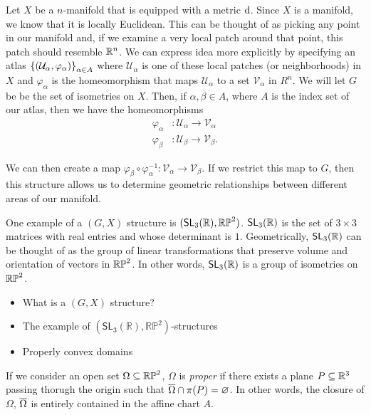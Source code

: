 \documentclass{amsart}
\begin{document}
	Let $X$ be a $n$-manifold that is equipped with a metric $\operatorname{d}$. Since $X$ is a manifold, we know that it is locally Euclidean. This can be thought of as picking any point in our manifold and, if we examine a very local patch around that point, this patch should resemble $\mathbb{R}^n$. We can express idea more explicitly by specifying an atlas $\left\{(\mathcal{U}_\alpha, \varphi_\alpha)\right\}_{\alpha \in A}$ where $\mathcal{U}_\alpha$ is one of these local patches (or neighborhoods) in $X$ and $\varphi_\alpha$ is the homeomorphism that maps $\mathcal{U}_\alpha$ to a set $\mathcal{V}_\alpha$ in $R^n$. We will let $G$ be be the set of isometries on $X$. Then, if $\alpha, \beta \in A$, where $A$ is the index set of our atlas, then we have the homeomorphisms
	\begin{equation*}
		\begin{split}
			\varphi_\alpha &\colon \mathcal{U}_\alpha \to \mathcal{V}_\alpha \\
			\varphi_\beta &\colon \mathcal{U}_\beta \to \mathcal{V}_\beta.
		\end{split}
	\end{equation*}
	
	We can then create a map $\varphi_\beta \circ \varphi_\alpha^{-1} \colon \mathcal{V}_\alpha \to \mathcal{V}_\beta$. If we restrict this map to $G$, then this structure allows us to determine geometric relationships between different areas of our manifold.
	
	One example of a $(G,X)$ structure is $(\mathsf{SL}_3(\mathbb{R}), \mathbb{RP}^2)$. $\mathsf{SL}_3(\mathbb{R})$ is the set of $3\times3$ matrices with real entries and whose determinant is $1$. Geometrically, $\mathsf{SL}_3(\mathbb{R})$ can be thought of as the group of linear transformations that preserve volume and orientation of vectors in $\mathbb{RP}^2$. In other words, $\mathsf{SL}_3(\mathbb{R})$ is a group of isometries on $\mathbb{RP}^2$.
	
	
	\begin{itemize}
		\item What is a $(G,X)$ structure?
		\item The example of $(\mathsf{SL}_3(\mathbb R),\mathbb{RP}^2)$-structures
		\item Properly convex domains
	\end{itemize}
	
	If we consider an open set $\Omega \subseteq \mathbb{RP}^2$, $\Omega$ is \emph{proper} if there exists a plane $P \subseteq \mathbb{R}^3$ passing thorugh the origin such that $\overline{\Omega} \cap \pi(P) = \varnothing$. In other words, the closure of $\Omega$, $\overline{\Omega}$ is entirely contained in the affine chart $A$.
	
\end{document}
